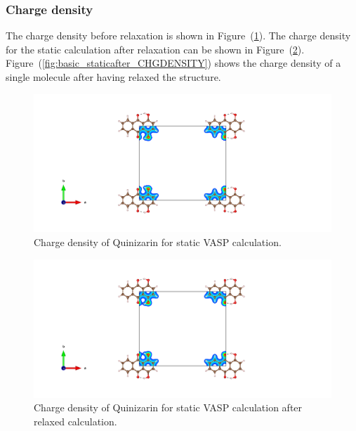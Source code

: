 \documentclass{article}
\begin{document}
      \vspace{1cm}

    \subsubsection{Charge density}

      The charge density before relaxation is shown in Figure~(\ref{fig:basic_staticbefore_CHGCAR}). The charge density for the static calculation after relaxation can be shown in Figure~(\ref{fig:basic_staticafter_CHGCAR}).
      Figure~(\ref{fig:basic_staticafter_CHGDENSITY}) shows the charge density of a single molecule after having relaxed the structure. \\

      \begin{figure}[H]
        \centering
        \includegraphics[width = \textwidth]{../fig/basic_staticbefore_CHGCAR.png}
        \caption{Charge density of Quinizarin for static VASP calculation. }
        \label{fig:basic_staticbefore_CHGCAR}
      \end{figure}

      \begin{figure}[H]
        \centering
        \includegraphics[width = \textwidth]{../fig/basic_staticafter_CHGCAR.png}
        \caption{Charge density of Quinizarin for static VASP calculation after relaxed calculation. }
        \label{fig:basic_staticafter_CHGCAR}
      \end{figure}
\end{document}

